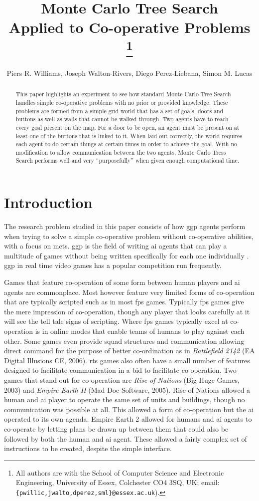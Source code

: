 \documentclass{IEEEtran}
\author{Piers R. Williams,  Joseph Walton-Rivers, Diego Perez-Liebana, Simon M. Lucas}
\title{Monte Carlo Tree Search\\ Applied to Co-operative Problems \thanks{All authors are with the School of Computer Science and Electronic Engineering, University of Essex, Colchester CO4 3SQ, UK; email: {\tt \{pwillic,jwalto,dperez,sml\}@essex.ac.uk}).} }
\begin{document}
\maketitle
\begin{abstract}
This paper highlights an experiment to see how standard Monte Carlo Tree Search handles simple co-operative problems with no prior or provided knowledge. These problems are formed from a simple grid world that has a set of goals, doors and buttons as well as walls that cannot be walked through. Two agents have to reach every goal present on the map. For a door to be open, an agent must be present on at least one of the buttons that is linked to it. When laid out correctly, the world requires each agent to do certain things at certain times in order to achieve the goal. With no modification to allow communication between the two agents, Monte Carlo Tress Search performs well and very ``purposefully'' when given enough computational time.
\end{abstract}

\section{Introduction}
The research problem studied in this paper consists of how \gls{ggp} agents perform when trying to solve a simple co-operative problem without co-operative abilities, with a focus on \gls{mcts}. \gls{ggp} is the field of writing \gls{ai} agents that can play a multitude of games without being written specifically for each one individually \cite{genesereth2005general}. \gls{ggp} in real time video games has a popular competition \cite{perez2014} run frequently.

Games that feature co-operation of some form between human players and \gls{ai} agents are commonplace. Most however feature very limited forms of co-operation that are typically scripted such as in most \gls{fps} games. Typically \gls{fps} games give the mere impression of co-operation, though any player that looks carefully at it will see the tell tale signs of scripting. Where \gls{fps} games typically excel at co-operation is in online modes that enable teams of humans to play against each other. Some games even provide squad structures and communication allowing direct command for the purpose of better co-ordination as in \textit{Battlefield 2142} (EA Digital Illusions CE, 2006). \gls{rts} games also often have a small number of features designed to facilitate communication in a bid to facilitate co-operation. Two games that stand out for co-operation are \textit{Rise of Nations} (Big Huge Games, 2003) and \textit{Empire Earth II} (Mad Doc Software, 2005). Rise of Nations allowed a human and \gls{ai} player to operate the same set of units and buildings, though no communication was possible at all. This allowed a form of co-operation but the \gls{ai} operated to its own agenda. Empire Earth 2 allowed for humans and \gls{ai} agents to co-operate by letting plans be drawn up between them that could also be followed by both the human and \gls{ai} agent. These allowed a fairly complex set of instructions to be created, despite the simple interface. 
\end{document}
